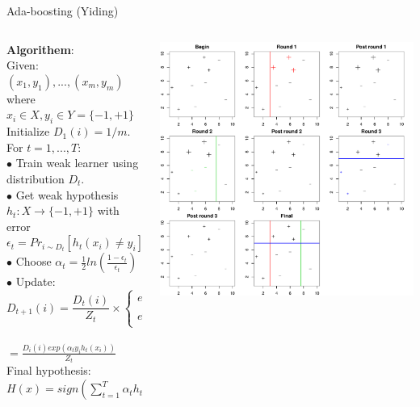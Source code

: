 \documentclass[table]{beamer}\usepackage[]{graphicx}\usepackage[]{color}
\makeatletter
\def\maxwidth{ %
  \ifdim\Gin@nat@width>\linewidth
    \linewidth
  \else
    \Gin@nat@width
  \fi
}
\newenvironment{knitrout}{}{} %
\makeatother
\begin{document}
\begin{frame}{Ada-boosting (Yiding)}
\begin{columns}[T]
\begin{column}[t]{5cm}
{\fontsize{0.2cm}{1em}\selectfont
\textbf{Algorithem}:\\
Given: $(x_1,y_1),...,(x_m,y_m)$ where $x_i \in X, y_i \in Y=\{-1,+1\}$ Initialize $D_1(i)=1/m$.\\
For $t=1,...,T$:\\
$\bullet$ Train weak learner using distribution $D_t$.\\
$\bullet$ Get weak hypothesis $h_t : X \rightarrow \{-1,+1\}$ with error $\epsilon_t=Pr_{i\sim D_t}\left[ h_t(x_i)\ne y_i \right]$\\
$\bullet$ Choose $\alpha_t=\frac{1}{2}ln\left(\frac{1-\epsilon_t}{\epsilon_t}\right)$\\
$\bullet$ Update:\\
$$
D_{t+1}(i)=\frac{D_t(i)}{Z_t}\times
\left\{ 
\begin{matrix}
e^{-\alpha_t} & \mbox{if $h_t(x_i)=y_i$}\\
e^{\alpha_t} & \mbox{if $h_t(x_i)\ne y_i$}
\end{matrix}
\right.
$$\\
$=\frac{D_i(i)exp(\alpha_t y_i h_t(x_i))}{Z_t}$ \\
Final hypothesis: $H(x)=sign\left(\sum_{t=1}^{T}\alpha_t h_t(x)\right)$

}
\end{column}

\begin{column}[t]{7cm}
\begin{knitrout}
\color{fgcolor}
\includegraphics[width=\maxwidth]{figure/unnamed-chunk-1} 

\end{knitrout}


\end{column}

\end{columns}
\end{frame}
\end{document}
